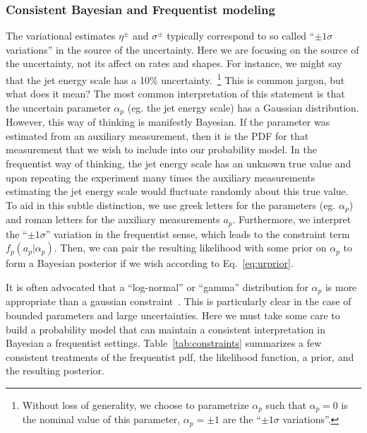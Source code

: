 \documentclass{cernrep}
\begin{document}
\subsubsection{Consistent Bayesian and Frequentist modeling}
\label{S:ConstraintExamples}

The variational estimates $\eta^\pm$ and $\sigma^\pm$ typically correspond to so called ``$\pm 1\sigma$ variations'' in the source of the uncertainty.  Here we are focusing on the source of the uncertainty, not its affect on rates and shapes.  For instance, we might say that the jet energy scale has a 10\% uncertainty.~\footnote{Without loss of generality, we choose to parametrize $\alpha_p$ such that $\alpha_p=0$ is the nominal value of this parameter, $\alpha_p=\pm 1$ are the ``$\pm 1\sigma$ variations''.}  This is common jargon, but what does it mean?  The most common interpretation of this statement is that the uncertain parameter $\alpha_p$ (eg. the jet energy scale) has a Gaussian distribution.  However, this way of thinking is manifestly Bayesian.  If the parameter was estimated from an auxiliary measurement, then it is the PDF for that measurement that we wish to include into our probability model.  In the frequentist way of thinking, the jet energy scale has an unknown true value and upon repeating the experiment many times the auxiliary measurements estimating the jet energy scale would fluctuate randomly about this true value.  To aid in this subtle distinction, we use greek letters for the parameters (eg. $\alpha_p$) and roman letters for the auxiliary measurements $a_p$.  Furthermore, we interpret the ``$\pm 1\sigma$'' variation in the frequentist sense, which leads to the constraint term $f_p(a_p | \alpha_p)$.  Then, we can pair the resulting likelihood with some prior on $\alpha_p$ to form a Bayesian posterior if we wish according to Eq.~\ref{eq:urprior}.

It is often advocated that a ``log-normal'' or ``gamma'' distribution for $\alpha_p$ is more appropriate than a gaussian constraint~\cite{CousinsLogNormal}.  This is particularly clear in the case of bounded parameters and large uncertainties.    Here we must take some care to build a probability model that can maintain a consistent interpretation in Bayesian a frequentist settings.  Table~\ref{tab:constraints} summarizes a few consistent treatments of the frequentist pdf, the likelihood function, a prior, and the resulting posterior.
\end{document}
